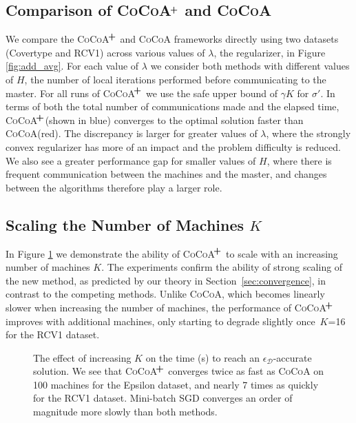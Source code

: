 \documentclass{article}
\newcommand{\cocoa}{\textsc{CoCoA}\xspace}
\newcommand{\cocoap}{\textsc{CoCoA$\!^{\bf \textbf{\footnotesize+}}$}\xspace}
\newcommand{\0}{ {\bf 0}}
\newcommand{\bD}{\mathcal{D}}
\theoremstyle{plain}
\theoremstyle{definition}
\begin{document}
{\subsection{Comparison of \cocoap and \cocoa}
\label{sec:addavg}
We compare the \cocoap and \cocoa frameworks directly using two datasets 
(Covertype and RCV1) across various values of $\lambda$, the regularizer, in Figure 
\ref{fig:add_avg}. For each value of $\lambda$ we consider both methods with 
different values of $H$, the number of local iterations performed before 
communicating to the master. For all runs of \cocoap we use the safe upper bound of 
$\gamma K$ for $\sigma'$. In terms of both the total number of communications 
made and the elapsed time, \cocoap (shown in blue) converges to the optimal solution 
faster than \cocoa (red). The discrepancy is larger for greater values of $\lambda$, 
where the  strongly convex regularizer has more of an impact and the problem 
difficulty is reduced. We also see a greater performance gap for smaller values of $H$, 
where there is frequent communication between the machines and the master, and changes between the algorithms therefore play a larger role. 



\subsection{Scaling the Number of Machines $K$}
\label{sec:scaling}

In Figure \ref{fig:scaling_k} we demonstrate the ability of \cocoap to scale with an 
increasing number of machines $K$. The experiments confirm the ability of strong 
scaling of the new method, as predicted by our theory in Section~\ref{sec:convergence}, 
in contrast to the competing methods.
Unlike \cocoa, which becomes linearly slower when increasing the number of 
machines, the performance of \cocoap improves with additional 
machines, only starting to degrade slightly once~$K$=16 for the RCV1 dataset.

\newcommand{\halftrimfig}[1]{\subfigure{\texttt{[image: \#1]}}}

\newcommand{\trimfig}[1]{\subfigure{\texttt{[image: \#1]}}}
\begin{figure}[ht!]
\centering
\halftrimfig{new_scaling_k_rcv.pdf}
\halftrimfig{scaling_k_all_rcv_log.pdf}
\trimfig{scaling_k_eps.pdf}
\vspace{-1em}
\caption{The effect of increasing $K$ on the time (s) to reach an $\epsilon_\bD$-accurate solution. We see that \cocoap converges twice as fast as \cocoa on 100 machines for the Epsilon dataset, and nearly 7 times as quickly for the RCV1 dataset. Mini-batch SGD converges an order of magnitude more slowly than both methods.} \vspace{-1em}
\label{fig:scaling_k}
\end{figure}

}
\end{document}
